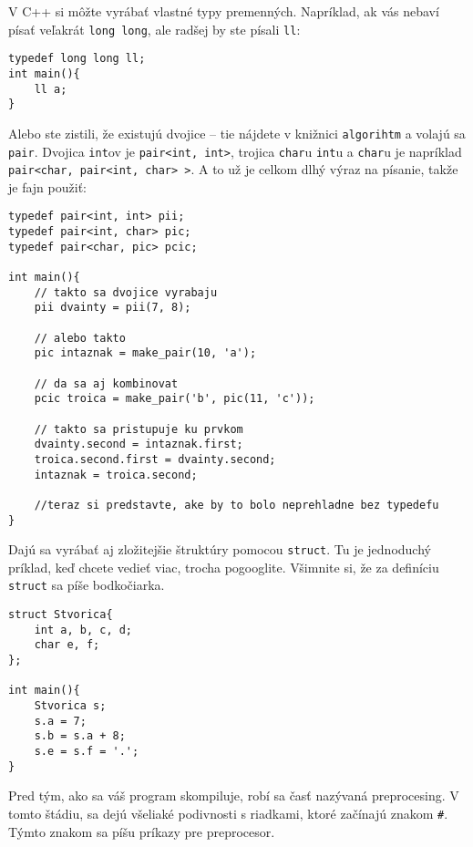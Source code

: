 
V C++ si môžte vyrábať vlastné typy premenných. Napríklad, ak vás nebaví písať
veľakrát \verb!long long!, ale radšej by ste písali \verb!ll!:

\begin{lstlisting}
typedef long long ll;
int main(){
    ll a;
}
\end{lstlisting}

Alebo ste zistili, že existujú dvojice -- tie nájdete v knižnici \verb!algorihtm! a volajú sa \verb!pair!.
Dvojica \verb!int!ov je \verb!pair<int, int>!, trojica \verb!char!u \verb!int!u a \verb!char!u je napríklad
\verb!pair<char, pair<int, char> >!. A to už je celkom dlhý výraz na písanie, takže je fajn použiť:

\begin{lstlisting}
typedef pair<int, int> pii;
typedef pair<int, char> pic;
typedef pair<char, pic> pcic;

int main(){
    // takto sa dvojice vyrabaju
    pii dvainty = pii(7, 8);

    // alebo takto
    pic intaznak = make_pair(10, 'a');

    // da sa aj kombinovat
    pcic troica = make_pair('b', pic(11, 'c'));
    
    // takto sa pristupuje ku prvkom
    dvainty.second = intaznak.first;
    troica.second.first = dvainty.second;
    intaznak = troica.second;

    //teraz si predstavte, ake by to bolo neprehladne bez typedefu
}
\end{lstlisting}

Dajú sa vyrábať aj zložitejšie štruktúry pomocou \verb!struct!. Tu je jednoduchý príklad,
keď chcete vedieť viac, trocha pogooglite. Všimnite si, že za definíciu \verb!struct! sa píše
bodkočiarka.

\begin{lstlisting}
struct Stvorica{
    int a, b, c, d;
    char e, f;
};

int main(){
    Stvorica s;
    s.a = 7;
    s.b = s.a + 8;
    s.e = s.f = '.';
}
\end{lstlisting}


Pred tým, ako sa váš program skompiluje, robí sa časť nazývaná preprocesing.  V
tomto štádiu, sa dejú všeliaké podivnosti s riadkami, ktoré začínajú znakom
\verb!#!.  Týmto znakom sa píšu príkazy pre preprocesor. 

